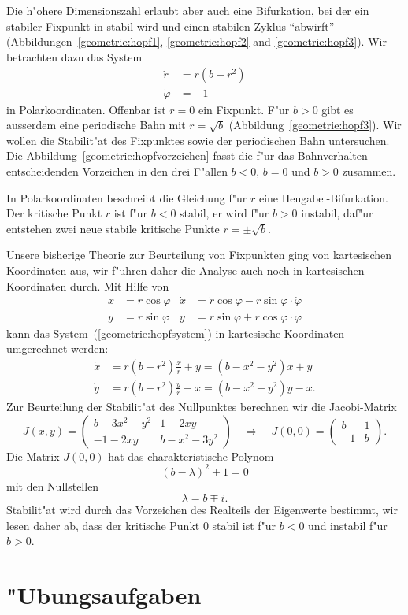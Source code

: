 Die h"ohere Dimensionszahl erlaubt aber auch eine Bifurkation, bei der
ein stabiler Fixpunkt in stabil wird und einen stabilen Zyklus ``abwirft''
(Abbildungen~\ref{geometrie:hopf1}, \ref{geometrie:hopf2} and
\ref{geometrie:hopf3}).
Wir betrachten dazu das System 
\begin{equation}
\begin{aligned}
\dot r      &= r(b-r^2)\\
\dot \varphi&= -1
\end{aligned}
\label{geometrie:hopfsystem}
\end{equation}
in Polarkoordinaten.
Offenbar ist $r=0$ ein Fixpunkt.
F"ur $b>0$ gibt es ausserdem eine periodische Bahn mit $r=\sqrt{b}$
(Abbildung~\ref{geometrie:hopf3}).
Wir wollen die Stabilit"at des Fixpunktes sowie der periodischen Bahn
untersuchen.
Die Abbildung~\ref{geometrie:hopfvorzeichen} fasst die f"ur das Bahnverhalten
entscheidenden Vorzeichen in den drei F"allen $b<0$, $b=0$ und $b>0$
zusammen.

In Polarkoordinaten beschreibt die Gleichung f"ur $r$ eine
Heugabel-Bifurkation.
Der kritische Punkt $r$ ist f"ur $b<0$ stabil, er wird f"ur $b>0$
instabil, daf"ur entstehen zwei neue stabile kritische Punkte
$r=\pm\sqrt{b}$.

Unsere bisherige Theorie zur Beurteilung von Fixpunkten ging von
kartesischen Koordinaten aus, wir f"uhren daher die Analyse auch noch
in kartesischen Koordinaten durch.
Mit Hilfe von 
\[
\begin{aligned}
x&=r\cos\varphi&\dot x&=\dot r\cos\varphi-r\sin\varphi\cdot\dot\varphi\\
y&=r\sin\varphi&\dot y&=\dot r\sin\varphi+r\cos\varphi\cdot\dot\varphi
\end{aligned}
\]
kann das System~(\ref{geometrie:hopfsystem}) in kartesische Koordinaten
umgerechnet werden:
\begin{equation}
\begin{aligned}
\dot x&=r(b-r^2)\frac{x}{r}+y=(b-x^2-y^2)x+y\\
\dot y&=r(b-r^2)\frac{y}{r}-x=(b-x^2-y^2)y-x.
\end{aligned}
\label{geometrie:hopf-kartesisch}
\end{equation}
Zur Beurteilung der Stabilit"at des Nullpunktes berechnen wir die
Jacobi-Matrix
\[
J(x,y)=
\begin{pmatrix}
b-3x^2-y^2&1-2xy\\
-1-2xy&b-x^2-3y^2
\end{pmatrix}
\quad\Rightarrow\quad
J(0,0)=\begin{pmatrix}
b&1\\-1&b
\end{pmatrix}.
\]
Die Matrix $J(0,0)$ hat das charakteristische Polynom
\[
(b-\lambda)^2+1=0
\]
mit den Nullstellen
\[
\lambda=b\mp i.
\]
Stabilit"at wird durch das Vorzeichen des Realteils der Eigenwerte
bestimmt, wir lesen daher ab, dass der kritische Punkt $0$ stabil
ist f"ur $b<0$ und instabil f"ur $b>0$.

\section{"Ubungsaufgaben}
\begin{uebungsaufgaben}
\item

\item

\item

\end{uebungsaufgaben}
